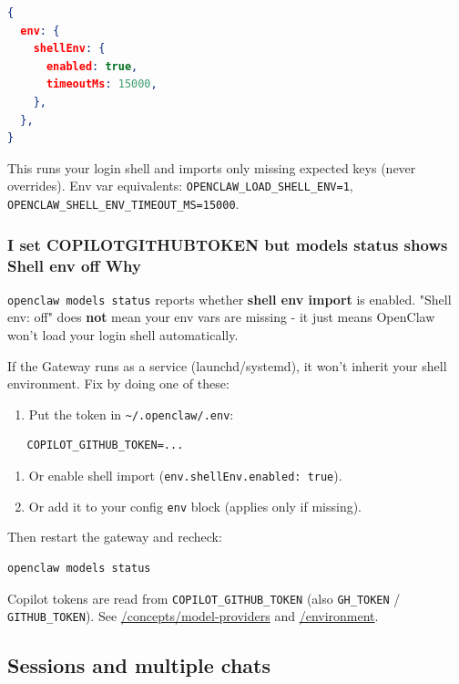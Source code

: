 \begin{lstlisting}[language=json]
{
  env: {
    shellEnv: {
      enabled: true,
      timeoutMs: 15000,
    },
  },
}
\end{lstlisting}


This runs your login shell and imports only missing expected keys (never overrides). Env var equivalents:
\texttt{OPENCLAW\_LOAD\_SHELL\_ENV=1}, \texttt{OPENCLAW\_SHELL\_ENV\_TIMEOUT\_MS=15000}.

\subsubsection{I set COPILOTGITHUBTOKEN but models status shows Shell env off Why}


\texttt{openclaw models status} reports whether \textbf{shell env import} is enabled. "Shell env: off"
does \textbf{not} mean your env vars are missing - it just means OpenClaw won't load
your login shell automatically.

If the Gateway runs as a service (launchd/systemd), it won't inherit your shell
environment. Fix by doing one of these:

\begin{enumerate}
  \item Put the token in \texttt{\textasciitilde{}/.openclaw/.env}:
\end{enumerate}


\begin{lstlisting}
   COPILOT_GITHUB_TOKEN=...
\end{lstlisting}


\begin{enumerate}
  \item Or enable shell import (\texttt{env.shellEnv.enabled: true}).
  \item Or add it to your config \texttt{env} block (applies only if missing).
\end{enumerate}


Then restart the gateway and recheck:

\begin{lstlisting}[language=bash]
openclaw models status
\end{lstlisting}


Copilot tokens are read from \texttt{COPILOT\_GITHUB\_TOKEN} (also \texttt{GH\_TOKEN} / \texttt{GITHUB\_TOKEN}).
See \href{/concepts/model-providers}{/concepts/model-providers} and \href{/help/environment}{/environment}.

\subsection{Sessions and multiple chats}


